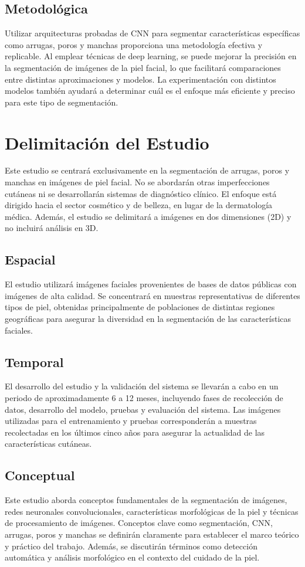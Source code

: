 \subsection{Metodológica}
Utilizar arquitecturas probadas de CNN para segmentar características específicas como arrugas, poros y manchas proporciona una metodología efectiva y replicable. Al emplear técnicas de deep learning, se puede mejorar la precisión en la segmentación de imágenes de la piel facial, lo que facilitará comparaciones entre distintas aproximaciones y modelos. La experimentación con distintos modelos también ayudará a determinar cuál es el enfoque más eficiente y preciso para este tipo de segmentación.

\section{Delimitación del Estudio}
Este estudio se centrará exclusivamente en la segmentación de arrugas, poros y manchas en imágenes de piel facial. No se abordarán otras imperfecciones cutáneas ni se desarrollarán sistemas de diagnóstico clínico. El enfoque está dirigido hacia el sector cosmético y de belleza, en lugar de la dermatología médica. Además, el estudio se delimitará a imágenes en dos dimensiones (2D) y no incluirá análisis en 3D.

\subsection{Espacial}
El estudio utilizará imágenes faciales provenientes de bases de datos públicas con imágenes de alta calidad. Se concentrará en muestras representativas de diferentes tipos de piel, obtenidas principalmente de poblaciones de distintas regiones geográficas para asegurar la diversidad en la segmentación de las características faciales.
  
\subsection{Temporal}
El desarrollo del estudio y la validación del sistema se llevarán a cabo en un periodo de aproximadamente 6 a 12 meses, incluyendo fases de recolección de datos, desarrollo del modelo, pruebas y evaluación del sistema. Las imágenes utilizadas para el entrenamiento y pruebas corresponderán a muestras recolectadas en los últimos cinco años para asegurar la actualidad de las características cutáneas.

\subsection{Conceptual}
Este estudio aborda conceptos fundamentales de la segmentación de imágenes, redes neuronales convolucionales, características morfológicas de la piel y técnicas de procesamiento de imágenes. Conceptos clave como segmentación, CNN, arrugas, poros y manchas se definirán claramente para establecer el marco teórico y práctico del trabajo. Además, se discutirán términos como detección automática y análisis morfológico en el contexto del cuidado de la piel.
